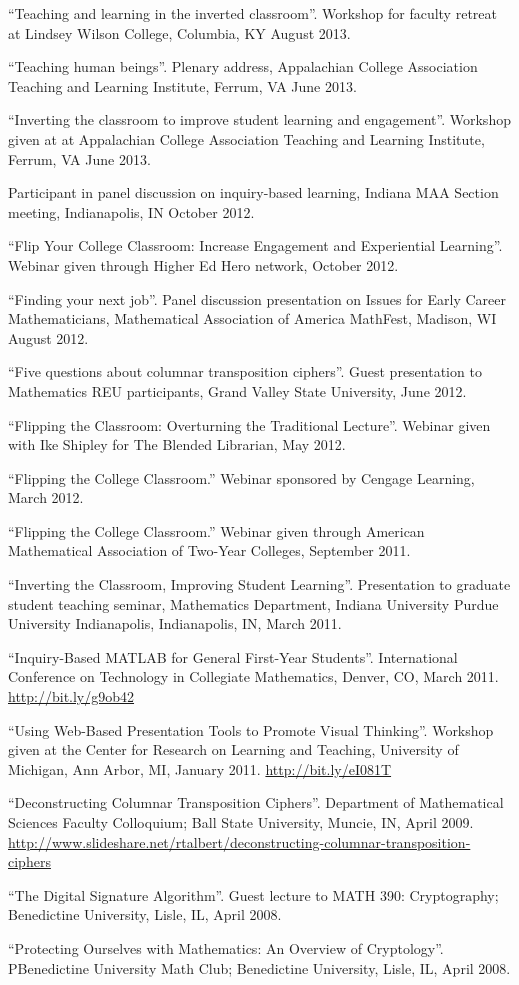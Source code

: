 \documentclass[letterpaper]{article}
\renewenvironment{itemize}{
  \begin{list}{}{
    \setlength{\leftmargin}{1.5em}
	\setlength{\itemsep}{0in}
  }
}{
  \end{list}
}
\begin{document}
\begin{itemize}
	\item ``Teaching and learning in the inverted classroom''. Workshop for faculty retreat at Lindsey Wilson College, Columbia, KY August 2013. 
	\item ``Teaching human beings''. Plenary address, Appalachian College Association Teaching and Learning Institute, Ferrum, VA June 2013. 
	\item ``Inverting the classroom to improve student learning and engagement''. Workshop given at at Appalachian College Association Teaching and Learning Institute, Ferrum, VA June 2013. 
	\item Participant in panel discussion on inquiry-based learning, Indiana MAA Section meeting, Indianapolis, IN October 2012. 
	\item ``Flip Your College Classroom: Increase Engagement and Experiential Learning''. Webinar given through Higher Ed Hero network, October 2012.
	\item ``Finding your next job''. Panel discussion presentation on Issues for Early Career Mathematicians, Mathematical Association of America MathFest, Madison, WI August 2012.
	\item ``Five questions about columnar transposition ciphers''. Guest presentation to Mathematics REU participants, Grand Valley State University, June 2012. 
	\item ``Flipping the Classroom: Overturning the Traditional Lecture''. Webinar given with Ike Shipley for The Blended Librarian, May 2012.
	\item ``Flipping the College Classroom.'' Webinar sponsored by Cengage Learning, March 2012.
	\item ``Flipping the College Classroom.'' Webinar given through American Mathematical Association of Two-Year Colleges, September 2011.
	\item  ``Inverting the Classroom, Improving Student Learning''. Presentation to graduate student teaching seminar, Mathematics Department, Indiana University Purdue University Indianapolis, Indianapolis, IN, March 2011. 
	\item ``Inquiry-Based MATLAB for General First-Year Students''. International Conference on Technology in Collegiate Mathematics, Denver, CO, March 2011. \url{http://bit.ly/g9ob42}
	\item ``Using Web-Based Presentation Tools to Promote Visual Thinking''. Workshop given at the Center for Research on Learning and Teaching, University of Michigan, Ann Arbor, MI, January 2011. \url{http://bit.ly/eI081T}
	\item ``Deconstructing Columnar Transposition Ciphers''. Department of Mathematical Sciences Faculty Colloquium; Ball State University, Muncie, IN, April 2009. \url{http://www.slideshare.net/rtalbert/deconstructing-columnar-transposition-ciphers}
	\item ``The Digital Signature Algorithm''. Guest lecture to MATH 390: Cryptography; Benedictine University, Lisle, IL, April 2008. 
	\item ``Protecting Ourselves with Mathematics: An Overview of Cryptology''. PBenedictine University Math Club; Benedictine University, Lisle, IL, April 2008.
\end{itemize}
\end{document}

